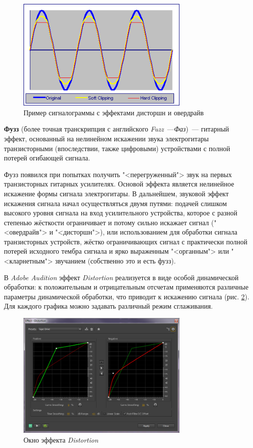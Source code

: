 \documentclass[oneside, final, 14pt]{extreport}
\begin{document}
\begin{figure}[h!]
  \centering
  \includegraphics[width=0.75\textwidth]{pic-overdrive-01}
  \caption{Пример сигналограммы с эффектами дисторшн и овердрайв}
  \label{pic-overdrive-01}
\end{figure}

\textbf{Фузз} (более точная транскрипция с английского \textit{Fuzz}~---\textit{Фаз})~--- гитарный эффект, основанный на нелинейном искажении звука электрогитары транзисторными (впоследствии, также цифровыми) устройствами с полной потерей огибающей сигнала.

Фузз появился при попытках получить "<перегруженный"> звук на первых транзисторных гитарных усилителях. Основой эффекта является нелинейное искажение формы сигнала электрогитары. В дальнейшем, звуковой эффект искажения сигнала начал осуществляться двумя путями: подачей слишком высокого уровня сигнала на вход усилительного устройства, которое с разной степенью жёсткости ограничивает и потому сильно искажает сигнал ("<овердрайв"> и "<дисторшн">), или использованием для обработки сигнала транзисторных устройств, жёстко ограничивающих сигнал с практически полной потерей исходного тембра сигнала и ярко выраженным "<органным"> или "<кларнетным"> звучанием (собственно это и есть фузз).

В \emph{Adobe Audition} эффект \emph{Distortion} реализуется в виде особой динамической обработки: к положительным и отрицательным отсчетам применяются различные параметры динамической обработки, что приводит к искажению сигнала (рис. \ref{pic-audistortion-01}). Для каждого графика можно задавать различный режим сглаживания.

\begin{figure}[h!]
  \centering
  \includegraphics[width=0.75\textwidth]{pic-audistortion-01}
  \caption{Окно эффекта \emph{Distortion}}
  \label{pic-audistortion-01}
\end{figure}
\end{document}
